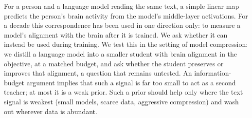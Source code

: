 For a person and a language model reading the same text, a simple linear map predicts the person's brain activity from the model's middle-layer activations. 
For a decade this correspondence has been used in one direction only: to measure a model's alignment with the brain after it is trained.
We ask whether it can instead be used during training.
We test this in the setting of model compression: we distill a language model into a smaller student with brain alignment in the objective, at a matched budget, and ask whether the student preserves or improves that alignment, a question that remains untested.
An information-budget argument implies that such a signal is far too small to act as a second teacher; at most it is a weak prior.
Such a prior should help only where the text signal is weakest (small models, scarce data, aggressive compression) and wash out wherever data is abundant.
